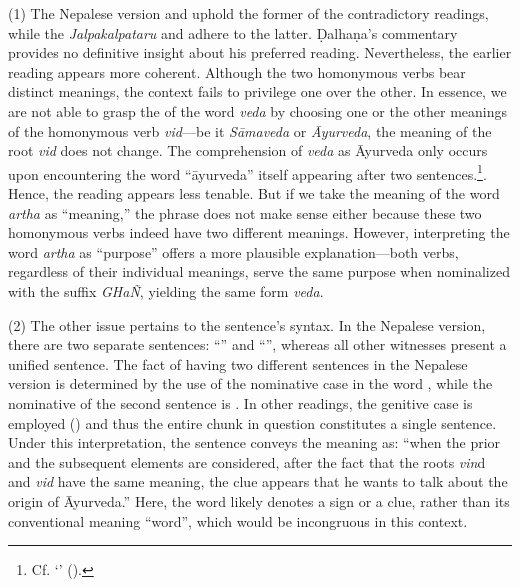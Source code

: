 (1) The Nepalese version and  uphold 
the former of the contradictory readings, 
while the \emph{Jalpakalpataru} and \Su{}{} adhere to the latter. 
Ḍalhaṇa's commentary provides no definitive insight about his preferred reading. 
Nevertheless, the earlier reading appears more coherent. 
Although the two homonymous verbs bear distinct meanings, 
the context fails to privilege one over the other. 
In essence, we are not able to grasp the  of the word \emph{veda} 
by choosing one or the other meanings of the homonymous verb \emph{vid}---be it \emph{Sāmaveda} or \emph{Āyurveda}, 
the meaning of the root \emph{vid} does not change. 
The comprehension of \emph{veda} as Āyurveda only occurs 
upon encountering the word “āyurveda” 
itself appearing after two sentences.\footnote{Cf. ‘’ 
	 ().}. 
Hence, the reading  appears less tenable. 
But if we take the meaning of the word \emph{artha} as “meaning,” 
the phrase  
does not make sense either because these two homonymous verbs indeed have two different meanings. 
However, interpreting the word \emph{artha} as “purpose” offers a more plausible explanation---both verbs, 
regardless of their individual meanings, 
serve the same purpose when nominalized with the suffix \emph{GHaÑ}, 
yielding the same form \emph{veda}. 

(2) The other issue pertains to the sentence’s syntax. 
In the Nepalese version, there are two separate sentences: 
“” 
and “”, 
whereas all other witnesses present a unified sentence. 
The fact of having two different sentences in the Nepalese version 
is determined by the use of the nominative case in the word , 
while the nominative of the second sentence is . 
In other readings, the genitive case is employed () 
and thus the entire chunk in question constitutes a single sentence. 
Under this interpretation, the sentence conveys the meaning as: 
“when the prior and the subsequent elements are considered, 
after the fact that the roots \emph{vin}d and \emph{vid} have the same meaning, 
the clue appears that he wants to talk about the origin of Āyurveda.” 
Here, the word  likely denotes a sign or a clue, 
rather than its conventional meaning “word”, 
which would be incongruous in this context.

